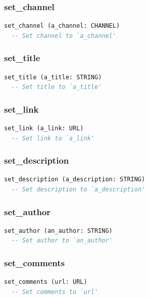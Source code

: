 \subsubsection{set\_channel}

\begin{lstlisting}[language=Eiffel]
set_channel (a_channel: CHANNEL)
  -- Set channel to `a_channel'
\end{lstlisting}

\subsubsection{set\_title}

\begin{lstlisting}[language=Eiffel]
set_title (a_title: STRING)
  -- Set title to `a_title'
\end{lstlisting}

\subsubsection{set\_link}

\begin{lstlisting}[language=Eiffel]
set_link (a_link: URL)
  -- Set link to `a_link'
\end{lstlisting}

\subsubsection{set\_description}

\begin{lstlisting}[language=Eiffel]
set_description (a_description: STRING)
  -- Set description to `a_description'
\end{lstlisting}

\subsubsection{set\_author}

\begin{lstlisting}[language=Eiffel]
set_author (an_author: STRING)
  -- Set author to `an_author'
\end{lstlisting}

\subsubsection{set\_comments}

\begin{lstlisting}[language=Eiffel]
set_comments (url: URL)
  -- Set comments to `url'
\end{lstlisting}

